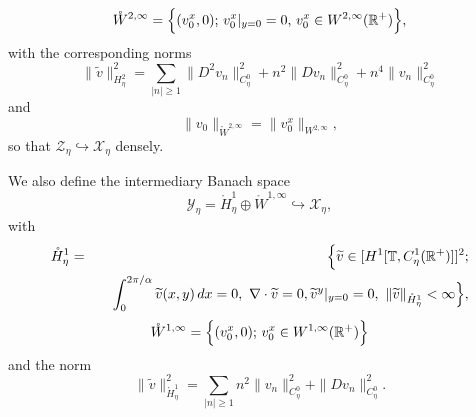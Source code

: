 \documentclass[11pt]{article}
\newtheorem{remark}[theorem]{Remark}
\begin{document}
\begin{equation*}
\mathring{W}^{2,\infty }= \Bigl\{ (v_{0}^{x},0); \, v_{0}^{x}|_{y=0}=0, \, v_{0}^{x} 
\in W^{2,\infty }(\mathbb{R}^{+})\Bigr\},
\end{equation*}%
with the corresponding norms
\begin{equation*}
\|\widetilde{v}\|_{H_{\eta}^{2}}^{2}=\sum_{|n|\geq
1}\|D^{2}v_{n}\|_{C_{\eta}^{0}}^{2}+n^{2}\|Dv_{n}\|_{C_{\eta}^{0}}^{2}+n^{4}\|v_{n}\|_{C_{\eta}^{0}}^{2}
\end{equation*}%
and
\begin{equation*}
\|v_{0}\|_{\mathring{W}^{2,\infty }}=\|v_{0}^{x}\|_{W^{2,\infty }},
\end{equation*}%
so that $\mathcal{Z}_{\eta}\mathcal{\hookrightarrow X}_{\eta}$ densely.

We also define the intermediary Banach space
\begin{equation*}
\mathcal{Y}_{\eta}=\mathring{H}_{\eta}^{1}\oplus \mathring{W}^{1,\infty
}\hookrightarrow \mathcal{X}_{\eta},
\end{equation*}%
with 
\begin{eqnarray*}
\mathring{H}_{\eta}^{1} &=&\Bigl\{ \widetilde{v}\in \lbrack H^{1}[\mathbb{T},C_{\eta}^{1}( \mathbb{R}^{+})]]^{2}; \\
&&\quad \int_{0}^{2\pi/\alpha }\widetilde{v}(x,y) \, dx=0,\text{ } \nabla \cdot 
\widetilde{v}=0,\widetilde{v}^{y}|_{y=0}=0,\text{ }\|\widetilde{v}\|_{%
\mathring{H}_{\eta}^{1}}<\infty \Bigr\} ,
\end{eqnarray*}%
\begin{equation*}
\mathring{W}^{1,\infty }= \Bigl\{(v_{0}^{x},0); \, v_{0}^{x}\in W^{1,\infty }(\mathbb{R}^{+})\Bigr\}
\end{equation*}%
and the norm%
\begin{equation*}
\|\widetilde{v}\|_{\mathring{H}_{\eta}^{1}}^{2}=\sum_{|n|\geq
1}n^{2}\|v_{n}\|_{C_{\eta}^{0}}^{2}+\|Dv_{n}\|_{C_{\eta}^{0}}^{2}.
\end{equation*}%






\end{document}
